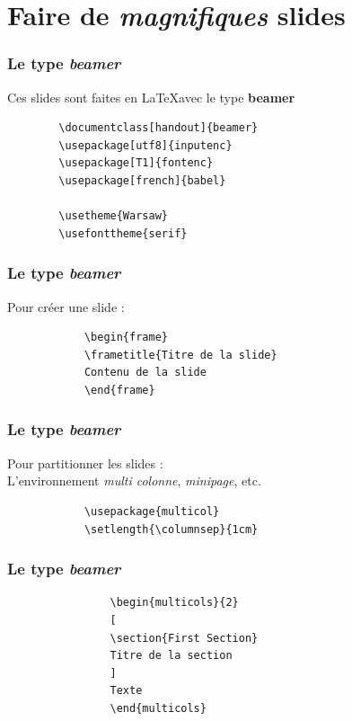 \documentclass[handout]{beamer}
\begin{document}
\section{Faire de \textit{magnifiques} slides}


\begin{frame}[fragile=singleslide]
	\frametitle{Le type \textit{beamer}}
	\centering Ces slides sont faites en \LaTeX avec le type \textbf{beamer}\\

	\begin{verbatim}
		\documentclass[handout]{beamer}
		\usepackage[utf8]{inputenc}
		\usepackage[T1]{fontenc}
		\usepackage[french]{babel}

		\usetheme{Warsaw}
		\usefonttheme{serif}
	\end{verbatim}
\end{frame}

\begin{frame}[fragile=singleslide]
	\frametitle{Le type \textit{beamer}}
	\centering
	Pour créer une slide :

			\begin{verbatim}
			\begin{frame}
			\frametitle{Titre de la slide}
			Contenu de la slide
			\end{frame}
			\end{verbatim}

\end{frame}

\begin{frame}[fragile=singleslide]
	\frametitle{Le type \textit{beamer}}
	\centering
	Pour partitionner les slides :\\
	L'environnement \textit{multi colonne}, \textit{minipage}, etc.

			\begin{verbatim}
			\usepackage{multicol}
			\setlength{\columnsep}{1cm}
			\end{verbatim}

\end{frame}

\begin{frame}[fragile=singleslide]
	\frametitle{Le type \textit{beamer}}
	\centering

			\begin{verbatim}
				\begin{multicols}{2}
				[
				\section{First Section}
				Titre de la section
				]
				Texte
				\end{multicols}
			\end{verbatim}

\end{frame}
\end{document}
